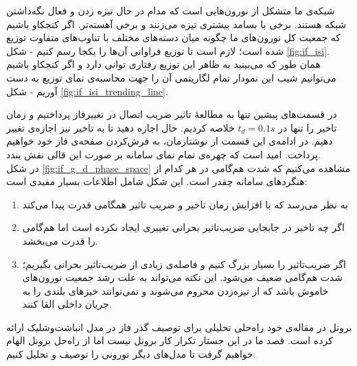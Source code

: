 شبکه‌ی ما متشکل از نورون‌هایی است که مدام در حال تیزه زدن و فعال نگه‌داشتن شبکه هستند. برخی با بسامد بیشتری تیزه می‌زنند و برخی آهسته‌تر. اگر کنجکاو باشیم که جمعیت کل نورون‌های ما چگونه میان دسته‌های مختلف با تناوب‌های متفاوت توزیع شده‌ است؛ لازم است تا توزیع فراوانی آن‌ها را یکجا رسم کنیم - شکل \ref{fig:if_isi}.\\
همان طور که می‌بینید به ظاهر این توزیع رفتاری توانی دارد و اگر کنجکاو باشیم می‌توانیم شیب این نمودار تمام لگاریتمی آن را جهت محاسبه‌ی نمای توزیع به دست آوریم - شکل \ref{fig:if_isi_trending_line}.

در قسمت‌های پیشین تنها به مطالعهٔ تاثیر ضریب اتصال در تغییرفاز پرداختیم و زمان تاخیر را تنها در $t_d = 0.1 s$ خلاصه کردیم. حال اجازه دهید تا به تاخیر نیز اجازه‌ی تغییر دهیم. در ادامه‌ی این قسمت از نوشتارمان، به فرش‌کردن صفحه‌ی فاز خود خواهیم پرداخت. امید است که چهره‌ی تمام نمای سامانه‌ بر صورت این قالی نقش بندد.\\


در شکل \ref{fig:if_g_d_phase_space} مشاهده می‌کنیم که شدت هم‌گامی در هر کدام از هنگردهای سامانه چقدر است. این شکل شامل اطلاعات بسیار مفیدی است:

\begin{enumerate}[1.]
	\item 
	به نظر می‌رسد که با افزایش زمان تاخیر و ضریب تاثیر همگامی قدرت پیدا می‌کند
	\item 
	اگر چه تاخیر در جابجایی ضریب‌تاثیر بحرانی تغییری ایجاد نکرده است اما هم‌گامی را قدرت می‌بخشد.
	\item
	اگر ضریب‌تاثیر را بسیار بزرگ کنیم و فاصله‌ی زیادی از ضریب‌تاثیر بحرانی بگیریم؛ شدت هم‌گامی ضعیف می‌شود. این نکته می‌تواند به علت رشد جمعیت نورون‌های خاموش باشد که از تیزه‌زدن محروم می‌شوند و نمی‌توانند خیزهای بلندی را به جریان داخلی القا کنند.
\end{enumerate}

برونل در مقاله‌ی خود 
\cite{brunel2000dynamics}
راه‌حلی تحلیلی برای توصیف گذر فاز در مدل انباشت‌وشلیک ارائه کرده است. قصد ما در این جستار تکرار کار برونل نیست اما از راه‌حل برونل الهام خواهیم گرفت تا مدل‌های دیگر نورونی را توصیف و تحلیل کنیم.
